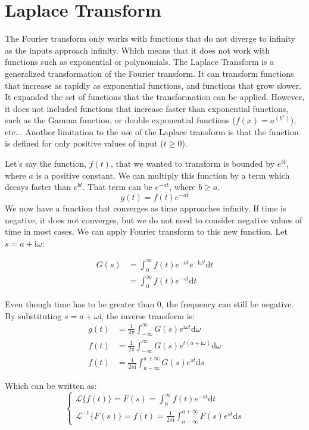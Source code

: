 \section{Laplace Transform}
The Fourier transform only works with functions that do not diverge to infinity as the inputs approach infinity. 
Which means that it does not work with functions such as exponential or polynomials. The Laplace Transform is a 
generalized transformation of the Fourier transform. It can transform functions that increase as rapidly as 
exponential functions, and functions that grow slower. It expanded the set of functions that the transformation 
can be applied. However, it does not included functions that increase faster than exponential functions, such as the 
Gamma function, or double exponential functions ($f(x)=a^{(b^x)}$), etc... Another limitation to the use of the 
Laplace transform is that the function is defined for only positive values of input ($t\geq 0$). 

\indent Let's say the function, $f(t)$, that we wanted to transform is bounded by $e^{bt}$, 
where $a$ is a positive constant. We can multiply this function by a term 
which decays faster than $e^{bt}$. That term can be $e^{-at}$, where $b\geq a$. 
$$ g(t) = f(t)e^{-at} $$
We now have a function that converges as time approaches infinity.
If time is negative, it does not converges, but we do not need to consider negative 
values of time in most cases. We can apply Fourier transform to this new function. 
Let $s=a+\mathrm{i}\omega$: 

$$\begin{aligned}
    G(s) &= \int_{0}^{\infty} 
                    f(t)e^{-at}e^{-\mathrm{i}\omega t} \mathrm{d}t  \\
    &= \int_{0}^{\infty} f(t)e^{-st} \mathrm{d}t
\end{aligned}$$

Even though time has to be greater than 0, the frequency can still be negative. By substituting $s=a+\omega\mathrm{i}$, 
the inverse transform is:
$$\begin{aligned}
    g(t) &= \frac{1}{2\pi} \int_{-\infty}^{\infty} 
        G(s)e^{\mathrm{i}\omega t} \mathrm{d}\omega  \\
    f(t) &= \frac{1}{2\pi} \int_{-\infty}^{\infty} 
            G(s)e^{t(a+\mathrm{i}\omega)} \mathrm{d}\omega  \\
    f(t) &= \frac{1}{2\pi\mathrm{i}} \int_{a-\infty}^{a+\infty} G(s)e^{st} \mathrm{d}s
\end{aligned}$$

Which can be written as:
\begin{equation}\begin{cases}
    \mathcal{L}\{f(t)\} = F(s) = \displaystyle\int_{0}^{\infty} f(t)e^{-st} \mathrm{d}t     \\
    \mathcal{L}^{-1}\{F(s)\} = f(t) = \frac{1}{2\pi\mathrm{i}} \displaystyle\int_{a-\infty}^{a+\infty} F(s)e^{st} \mathrm{d}s
\end{cases}
\label{equ:laplace_transfrom}
\end{equation}
